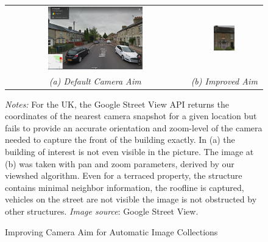 \documentclass[]{article}
\begin{document}
\clearpage

\begin{figure}[hbt]
  \caption{Improving Camera Aim for Automatic Image Collections}
  \centering
  \vspace{0.25cm}
  \begin{tabular}{cc}
    \includegraphics[width=0.55\textwidth]{figures/84VineryRD.png} & \includegraphics[width=0.3\textwidth]{figures/84VineryRoadGoodAim.png} \\
    \emph{(a) Default Camera Aim} & \emph{(b) Improved Aim}\\

\end{tabular}

  \label{fig:84Vin}
\begin{minipage}{0.8\textwidth}
\footnotesize 
\vspace{0.25cm}
\emph{Notes:} For the UK, the Google Street View API returns the coordinates of the nearest camera snapshot for a given location but fails to provide an accurate orientation and zoom-level of the camera needed to capture the front of the building exactly. In (a) the building of interest is not even visible in the picture. The image at (b) was taken with pan and zoom parameters, derived by our viewshed algorithm. Even for a terraced property, the structure contains minimal neighbor information, the roofline is captured, vehicles on the street are not visible the image is not obstructed by other structures.  
\emph{Image source}: Google Street View. 
\end{minipage}
\end{figure}
\end{document}

